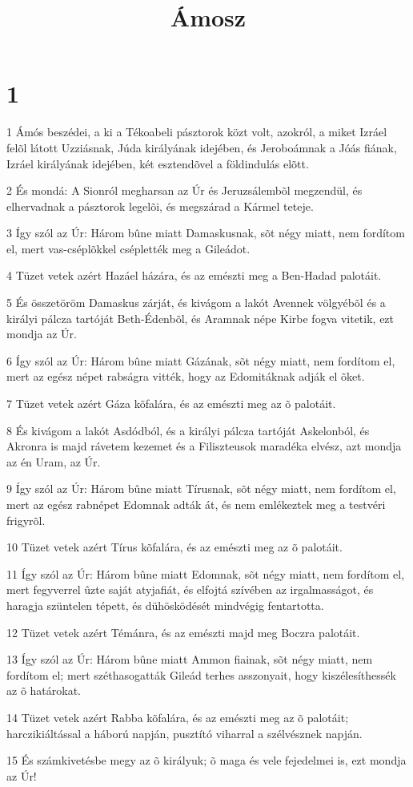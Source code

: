 

\title{Ámosz}


\chapter{1}

\par 1 Ámós beszédei, a ki a Tékoabeli pásztorok közt volt, azokról, a miket Izráel felõl látott  Uzziásnak, Júda királyának idejében, és Jeroboámnak a Jóás fiának, Izráel királyának idejében, két esztendõvel a földindulás elõtt.
\par 2 És mondá: A Sionról megharsan az Úr és Jeruzsálembõl megzendül, és elhervadnak a pásztorok legelõi, és megszárad a Kármel teteje.
\par 3 Így szól az Úr: Három bûne miatt Damaskusnak, sõt négy miatt, nem fordítom el, mert vas-cséplõkkel cséplették meg a Gileádot.
\par 4 Tüzet vetek azért Hazáel házára, és az emészti meg a Ben-Hadad palotáit.
\par 5 És összetöröm Damaskus zárját, és kivágom a lakót Avennek völgyébõl és a királyi pálcza tartóját Beth-Édenbõl, és Aramnak népe Kirbe fogva vitetik, ezt mondja az Úr.
\par 6 Így szól az Úr: Három bûne miatt Gázának, sõt négy miatt, nem fordítom el, mert az egész népet rabságra vitték, hogy az Edomitáknak adják el õket.
\par 7 Tüzet vetek azért Gáza kõfalára, és az emészti meg az õ palotáit.
\par 8 És kivágom a lakót Asdódból, és a királyi pálcza tartóját Askelonból, és Akronra is majd rávetem kezemet és a Filiszteusok maradéka elvész, azt mondja az én Uram, az Úr.
\par 9 Így szól az Úr: Három bûne miatt Tírusnak, sõt négy miatt, nem fordítom el, mert az egész rabnépet Edomnak adták át, és nem emlékeztek meg a testvéri  frigyrõl.
\par 10 Tüzet vetek azért Tírus kõfalára, és az emészti meg az õ palotáit.
\par 11 Így szól az Úr: Három bûne miatt Edomnak, sõt négy miatt, nem fordítom el, mert fegyverrel ûzte saját atyjafiát, és elfojtá szívében az irgalmasságot, és haragja szüntelen tépett, és dühösködését mindvégig fentartotta.
\par 12 Tüzet vetek azért Témánra, és az emészti majd meg Boczra palotáit.
\par 13 Így szól az Úr: Három bûne miatt Ammon fiainak, sõt négy miatt, nem fordítom el; mert széthasogatták Gileád terhes asszonyait, hogy kiszélesíthessék az õ határokat.
\par 14 Tüzet vetek azért Rabba kõfalára, és az emészti meg az õ palotáit; harczikiáltással a háború napján, pusztító viharral a szélvésznek napján.
\par 15 És számkivetésbe megy az õ királyuk; õ maga és vele fejedelmei is, ezt mondja az Úr!


